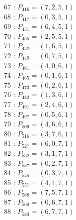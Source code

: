 \documentclass{article}
\begin{document}
{\begin{multicols}{3}
67 : $P_{416}=( 7, 2, 5, 1 )$\\
68 : $P_{417}=( 0, 3, 5, 1 )$\\
69 : $P_{431}=( 6, 4, 5, 1 )$\\
70 : $P_{435}=( 2, 5, 5, 1 )$\\
71 : $P_{442}=( 1, 6, 5, 1 )$\\
72 : $P_{449}=( 0, 7, 5, 1 )$\\
73 : $P_{461}=( 4, 0, 6, 1 )$\\
74 : $P_{465}=( 0, 1, 6, 1 )$\\
75 : $P_{473}=( 0, 2, 6, 1 )$\\
76 : $P_{482}=( 1, 3, 6, 1 )$\\
77 : $P_{491}=( 2, 4, 6, 1 )$\\
78 : $P_{497}=( 0, 5, 6, 1 )$\\
79 : $P_{509}=( 4, 6, 6, 1 )$\\
80 : $P_{516}=( 3, 7, 6, 1 )$\\
81 : $P_{527}=( 6, 0, 7, 1 )$\\
82 : $P_{532}=( 3, 1, 7, 1 )$\\
83 : $P_{537}=( 0, 2, 7, 1 )$\\
84 : $P_{545}=( 0, 3, 7, 1 )$\\
85 : $P_{557}=( 4, 4, 7, 1 )$\\
86 : $P_{568}=( 7, 5, 7, 1 )$\\
87 : $P_{569}=( 0, 6, 7, 1 )$\\
88 : $P_{583}=( 6, 7, 7, 1 )$\\
\end{multicols}


%


%


}%
\end{document}
